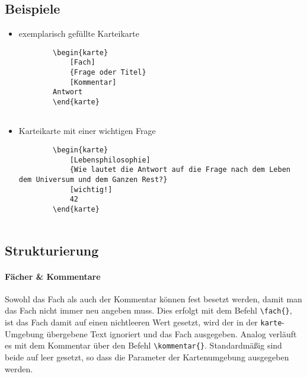 \documentclass[a4paper]{article}
\begin{document}
\subsection{Beispiele}
\begin{itemize}
	\item exemplarisch gefüllte Karteikarte
	\begin{lstlisting}
		\begin{karte}
			[Fach]
			{Frage oder Titel}
			[Kommentar]
		Antwort
		\end{karte}
		
	\end{lstlisting} 
	\item Karteikarte mit einer wichtigen Frage
	\begin{lstlisting}
		\begin{karte}
			[Lebensphilosophie]
			{Wie lautet die Antwort auf die Frage nach dem Leben dem Universum und dem Ganzen Rest?}
			[wichtig!]
			42
		\end{karte}
		
	\end{lstlisting}
\end{itemize}

\subsection{Strukturierung}
\paragraph{Fächer \& Kommentare}
Sowohl das Fach als auch der Kommentar können fest besetzt werden, damit man das Fach nicht immer neu angeben muss. Dies erfolgt mit dem Befehl \lstinline!\fach{}!, ist das Fach damit auf einen nichtleeren Wert gesetzt, wird der in der \lstinline!karte!-Umgebung übergebene Text ignoriert und das Fach ausgegeben. Analog verläuft es mit dem Kommentar über den Befehl \lstinline!\kommentar{}!. Standardmäßig sind beide auf leer gesetzt, so dass die Parameter der Kartenumgebung ausgegeben werden. 
\end{document}
